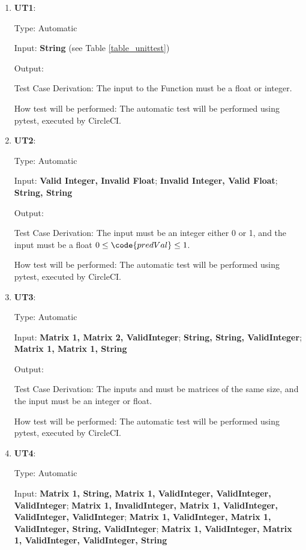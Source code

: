 \documentclass[12pt, titlepage]{article}
\begin{document}
\begin{enumerate}

\item{\textbf{UT1}: }

Type: Automatic
					
Input: \textbf{String} (see Table \ref{table_unittest})
					
Output: 

Test Case Derivation: The input to the  Function must be a float or integer.

How test will be performed: The automatic test will be performed using pytest, executed by CircleCI.


\item{\textbf{UT2}: }

Type: Automatic
					
Input: \textbf{Valid Integer, Invalid Float}; \textbf{Invalid Integer, Valid Float}; \textbf{String, String}
					
Output: 

Test Case Derivation: The input  must be an integer either 0 or 1, and the input  must be a float $0 \leq \code{predVal} \leq 1$.

How test will be performed: The automatic test will be performed using pytest, executed by CircleCI.

\item{\textbf{UT3}: }

Type: Automatic
					
Input: \textbf{Matrix 1, Matrix 2, ValidInteger}; \textbf{String, String, ValidInteger}; \textbf{Matrix 1, Matrix 1, String}
					
Output: 

Test Case Derivation: The inputs  and  must be matrices of the same size, and the input  must be an integer or float.

How test will be performed: The automatic test will be performed using pytest, executed by CircleCI.

\item{\textbf{UT4}: }

Type: Automatic
					
Input: \textbf{Matrix 1, String, Matrix 1, ValidInteger, ValidInteger, ValidInteger}; \textbf{Matrix 1, InvalidInteger, Matrix 1, ValidInteger, ValidInteger, ValidInteger}; \textbf{Matrix 1, ValidInteger, Matrix 1, ValidInteger, String, ValidInteger}; \textbf{Matrix 1, ValidInteger, Matrix 1, ValidInteger, ValidInteger, String}
					

\end{enumerate}
\end{document}
